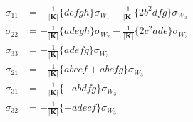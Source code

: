 \documentclass{article}
\begin{document}
\begin{equation}
\begin{aligned}
\sigma_{11}&=-\frac{1}{|\mathbf{K}|} \{ defgh \}\sigma_{W_{1}} -\frac{1}{|\mathbf{K}|} \{ 2b^2 dfg \} \sigma_{W_{3}}\\
\sigma_{22}&=-\frac{1}{|\mathbf{K}|} \{ adegh \}\sigma_{W_{2}} -\frac{1}{|\mathbf{K}|} \{ 2c^2ade \} \sigma_{W_{3}}\\
\sigma_{33}&=-\frac{1}{|\mathbf{K}|} \{ adefg \} \sigma_{W_{3}}\\
\sigma_{21}&=-\frac{1}{|\mathbf{K}|} \{ abcef+abcfg \} \sigma_{W_{3}}\\
\sigma_{31}&=-\frac{1}{|\mathbf{K}|} \{ -abdfg \} \sigma_{W_{3}}\\
\sigma_{32}&=-\frac{1}{|\mathbf{K}|} \{ -adecf \} \sigma_{W_{3}}\\
\end{aligned}
\end{equation}
\end{document}

